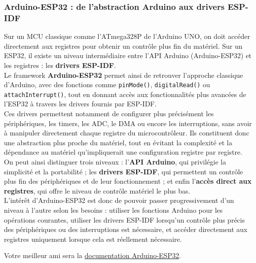 \newpage

\subsubsection{Arduino-ESP32 : de l'abstraction Arduino aux drivers ESP-IDF}

Sur un MCU classique comme l'ATmega328P de l'Arduino UNO, on doit accéder directement aux registres pour obtenir un contrôle plus fin du matériel. Sur un ESP32, il existe un niveau intermédiaire entre l'API Arduino (Arduino-ESP32) et les registres : les \textbf{drivers ESP-IDF}.\\

Le framework \textbf{Arduino-ESP32} permet ainsi de retrouver l'approche classique d'Arduino, avec des fonctions comme \texttt{pinMode()}, \texttt{digitalRead()} ou \texttt{attachInterrupt()}, tout en donnant accès aux fonctionnalités plus avancées de l'ESP32 à travers les drivers fournis par ESP-IDF.\\

Ces drivers permettent notamment de configurer plus précisément les périphériques, les timers, les ADC, le DMA ou encore les interruptions, sans avoir à manipuler directement chaque registre du microcontrôleur. Ils constituent donc une abstraction plus proche du matériel, tout en évitant la complexité et la dépendance au matériel qu'impliquerait une configuration registre par registre.\\

On peut ainsi distinguer trois niveaux : l'\textbf{API Arduino}, qui privilégie la simplicité et la portabilité ; les \textbf{drivers ESP-IDF}, qui permettent un contrôle plus fin des périphériques et de leur fonctionnement ; et enfin l'\textbf{accès direct aux registres}, qui offre le niveau de contrôle matériel le plus bas.\\

L'intérêt d'Arduino-ESP32 est donc de pouvoir passer progressivement d'un niveau à l'autre selon les besoins : utiliser les fonctions Arduino pour les opérations courantes, utiliser les drivers ESP-IDF lorsqu'un contrôle plus précis des périphériques ou des interruptions est nécessaire, et accéder directement aux registres uniquement lorsque cela est réellement nécessaire.\\

\begin{imp}
    Votre meilleur ami sera la \href{https://docs.espressif.com/projects/arduino-esp32/en/latest/getting_started.html}{documentation Arduino-ESP32}.
\end{imp}


